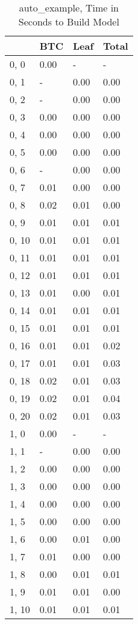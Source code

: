 \begin{table}
\centering
\caption{auto_example, Time in Seconds to Build Model}
\label{auto_example_model_time}
\begin{tabular}{llll}
\toprule
{} &   BTC &  Leaf & Total \\
\midrule
0, 0   &  0.00 &     - &     - \\
0, 1   &     - &  0.00 &  0.00 \\
0, 2   &     - &  0.00 &  0.00 \\
0, 3   &  0.00 &  0.00 &  0.00 \\
0, 4   &  0.00 &  0.00 &  0.00 \\
0, 5   &  0.00 &  0.00 &  0.00 \\
0, 6   &     - &  0.00 &  0.00 \\
0, 7   &  0.01 &  0.00 &  0.00 \\
0, 8   &  0.02 &  0.01 &  0.00 \\
0, 9   &  0.01 &  0.01 &  0.01 \\
0, 10  &  0.01 &  0.01 &  0.01 \\
0, 11  &  0.01 &  0.01 &  0.01 \\
0, 12  &  0.01 &  0.01 &  0.01 \\
0, 13  &  0.01 &  0.00 &  0.01 \\
0, 14  &  0.01 &  0.01 &  0.01 \\
0, 15  &  0.01 &  0.01 &  0.01 \\
0, 16  &  0.01 &  0.01 &  0.02 \\
0, 17  &  0.01 &  0.01 &  0.03 \\
0, 18  &  0.02 &  0.01 &  0.03 \\
0, 19  &  0.02 &  0.01 &  0.04 \\
0, 20  &  0.02 &  0.01 &  0.03 \\
1, 0   &  0.00 &     - &     - \\
1, 1   &     - &  0.00 &  0.00 \\
1, 2   &  0.00 &  0.00 &  0.00 \\
1, 3   &  0.00 &  0.00 &  0.00 \\
1, 4   &  0.00 &  0.00 &  0.00 \\
1, 5   &  0.00 &  0.00 &  0.00 \\
1, 6   &  0.00 &  0.01 &  0.00 \\
1, 7   &  0.01 &  0.00 &  0.00 \\
1, 8   &  0.00 &  0.01 &  0.01 \\
1, 9   &  0.01 &  0.01 &  0.00 \\
1, 10  &  0.01 &  0.01 &  0.01 \\

\end{tabular}
\end{table}
